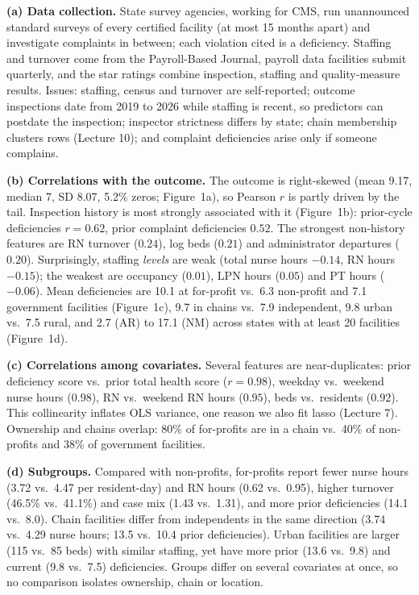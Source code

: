 \documentclass[11pt]{article}
\makeatletter
\renewcommand\section{\@startsection{section}{1}{\z@}{-1.6ex \@plus -.5ex \@minus -.2ex}{0.8ex \@plus .2ex}{\normalfont\large\bfseries}}
\makeatother
\begin{document}
\section{Data description and exploration}
\textbf{(a) Data collection.} State survey agencies, working for CMS, run unannounced standard surveys of every certified facility (at most 15 months apart) and investigate complaints in between; each violation cited is a deficiency. Staffing and turnover come from the Payroll-Based Journal, payroll data facilities submit quarterly, and the star ratings combine inspection, staffing and quality-measure results. Issues: staffing, census and turnover are self-reported; outcome inspections date from 2019 to 2026 while staffing is recent, so predictors can postdate the inspection; inspector strictness differs by state; chain membership clusters rows (Lecture 10); and complaint deficiencies arise only if someone complains.

\textbf{(b) Correlations with the outcome.} The outcome is right-skewed (mean 9.17, median 7, SD 8.07, 5.2\% zeros; Figure~1a), so Pearson $r$ is partly driven by the tail. Inspection history is most strongly associated with it (Figure~1b): prior-cycle deficiencies $r=0.62$, prior complaint deficiencies $0.52$. The strongest non-history features are RN turnover ($0.24$), log beds ($0.21$) and administrator departures ($0.20$). Surprisingly, staffing \emph{levels} are weak (total nurse hours $-0.14$, RN hours $-0.15$); the weakest are occupancy ($0.01$), LPN hours ($0.05$) and PT hours ($-0.06$). Mean deficiencies are 10.1 at for-profit vs.\ 6.3 non-profit and 7.1 government facilities (Figure~1c), 9.7 in chains vs.\ 7.9 independent, 9.8 urban vs.\ 7.5 rural, and 2.7 (AR) to 17.1 (NM) across states with at least 20 facilities (Figure~1d).

\textbf{(c) Correlations among covariates.} Several features are near-duplicates: prior deficiency score vs.\ prior total health score ($r=0.98$), weekday vs.\ weekend nurse hours ($0.98$), RN vs.\ weekend RN hours ($0.95$), beds vs.\ residents ($0.92$). This collinearity inflates OLS variance, one reason we also fit lasso (Lecture 7). Ownership and chains overlap: 80\% of for-profits are in a chain vs.\ 40\% of non-profits and 38\% of government facilities.

\textbf{(d) Subgroups.} Compared with non-profits, for-profits report fewer nurse hours (3.72 vs.\ 4.47 per resident-day) and RN hours (0.62 vs.\ 0.95), higher turnover (46.5\% vs.\ 41.1\%) and case mix (1.43 vs.\ 1.31), and more prior deficiencies (14.1 vs.\ 8.0). Chain facilities differ from independents in the same direction (3.74 vs.\ 4.29 nurse hours; 13.5 vs.\ 10.4 prior deficiencies). Urban facilities are larger (115 vs.\ 85 beds) with similar staffing, yet have more prior (13.6 vs.\ 9.8) and current (9.8 vs.\ 7.5) deficiencies. Groups differ on several covariates at once, so no comparison isolates ownership, chain or location.
\end{document}
